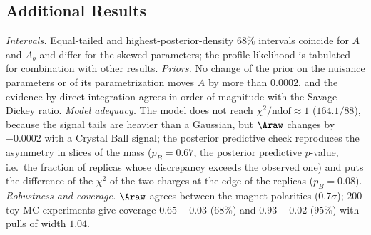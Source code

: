 \subsection{Additional Results}
\emph{Intervals.} Equal-tailed and highest-posterior-density $68\%$ intervals coincide for $A$ and $A_b$ and differ for the skewed parameters; the profile likelihood is tabulated for combination with other results.
\emph{Priors.} No change of the prior on the nuisance parameters or of its parametrization moves $A$ by more than $0.0002$, and the evidence by direct integration agrees in order of magnitude with the Savage-Dickey ratio.
\emph{Model adequacy.} The model does not reach $\chi^2/\mathrm{ndof}\approx1$ ($164.1/88$), because the signal tails are heavier than a Gaussian, but $\Araw$ changes by $-0.0002$ with a Crystal Ball signal; the posterior predictive check reproduces the asymmetry in slices of the mass ($p_B=0.67$, the posterior predictive $p$-value, i.e.\ the fraction of replicas whose discrepancy exceeds the observed one) and puts the difference of the $\chi^2$ of the two charges at the edge of the replicas ($p_B=0.08$).
\emph{Robustness and coverage.} $\Araw$ agrees between the magnet polarities ($0.7\sigma$); $200$ toy-MC experiments give coverage $0.65\pm0.03$ ($68\%$) and $0.93\pm0.02$ ($95\%$) with pulls of width $1.04$.
